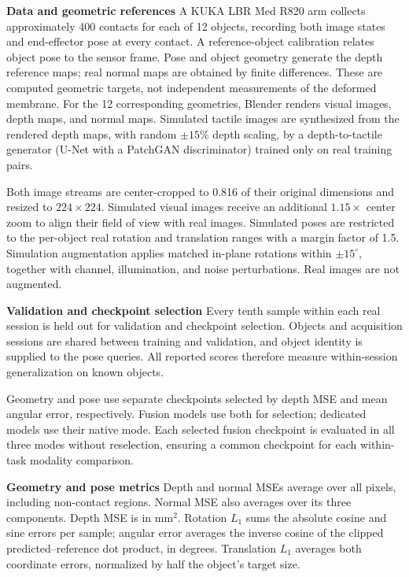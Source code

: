 \documentclass[letterpaper,10pt,conference]{ieeeconf}
\begin{document}
\noindent\textbf{Data and geometric references}
A KUKA LBR Med R820 arm collects approximately 400 contacts for each of 12 objects, recording both image states and end-effector pose at every contact. A reference-object calibration relates object pose to the sensor frame. Pose and object geometry generate the depth reference maps; real normal maps are obtained by finite differences. These are computed geometric targets, not independent measurements of the deformed membrane. For the 12 corresponding geometries, Blender renders visual images, depth maps, and normal maps. Simulated tactile images are synthesized from the rendered depth maps, with random $\pm15\%$ depth scaling, by a depth-to-tactile generator (U-Net with a PatchGAN discriminator) trained only on real training pairs.\unskip

Both image streams are center-cropped to 0.816 of their original dimensions and resized to $224\times224$. Simulated visual images receive an additional $1.15\times$ center zoom to align their field of view with real images. Simulated poses are restricted to the per-object real rotation and translation ranges with a margin factor of 1.5. Simulation augmentation applies matched in-plane rotations within $\pm15^\circ$, together with channel, illumination, and noise perturbations. Real images are not augmented.

\noindent\textbf{Validation and checkpoint selection}
Every tenth sample within each real session is held out for validation and checkpoint selection. Objects and acquisition sessions are shared between training and validation, and object identity is supplied to the pose queries. All reported scores therefore measure within-session generalization on known objects.

Geometry and pose use separate checkpoints selected by depth MSE and mean angular error, respectively. Fusion models use both for selection; dedicated models use their native mode. Each selected fusion checkpoint is evaluated in all three modes without reselection, ensuring a common checkpoint for each within-task modality comparison.

\noindent\textbf{Geometry and pose metrics}
Depth and normal MSEs average over all pixels, including non-contact regions. Normal MSE also averages over its three components. Depth MSE is in $\mathrm{mm}^2$. Rotation $L_1$ sums the absolute cosine and sine errors per sample; angular error averages the inverse cosine of the clipped predicted--reference dot product, in degrees. Translation $L_1$ averages both coordinate errors, normalized by half the object's target size.
\end{document}
